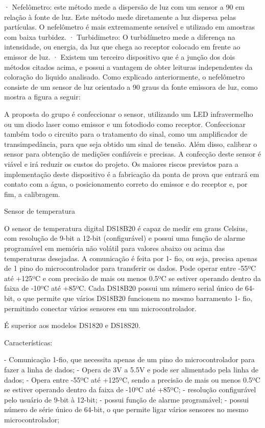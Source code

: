 ·         Nefelômetro: este método mede a dispersão de luz com um sensor a 90 em relação à fonte de luz. Este método mede diretamente a luz dispersa pelas partículas. O nefelômetro é mais extremamente sensível e utilizado em amostras com baixa turbidez.
·         Turbidimetro: O turbidímetro mede a diferença na intensidade, ou energia, da luz que chega ao receptor colocado em frente ao emissor de luz.
·         Existem um terceiro dispositivo que é a junção dos dois métodos citados acima, e possui a vantagem de obter leituras independentes da coloração do liquido analisado.
Como explicado anteriormente, o nefelômetro consiste de um sensor de luz orientado a 90 graus da fonte emissora de luz, como mostra a figura a seguir:



A proposta do grupo é confeccionar o sensor, utilizando um LED infravermelho ou um diodo laser como emissor e um fotodiodo como receptor. Confeccionar também todo o circuito para o tratamento do sinal, como um amplificador de transimpedância, para que seja obtido um sinal de tensão. Além disso, calibrar o sensor para obtenção de medições confiáveis e precisas. A confecção deste sensor é viável e irá reduzir os custos do projeto.
Os maiores riscos previstos para a implementação deste dispositivo é a fabricação da ponta de prova que entrará em contato com a água, o posicionamento correto do emissor e do receptor e, por fim, a calibragem.

Sensor de temperatura

O sensor de temperatura digital DS18B20 é capaz de medir em graus Celsius, com resolução de 9-bit a 12-bit (configurável) e possui uma função de alarme programável em memória não volátil para valores abaixo ou acima das temperaturas desejadas. A comunicação é feita por 1- fio, ou seja, precisa apenas de 1 pino do microcontrolador para transferir os dados. Pode operar entre -55ºC até +125ºC e com precisão de mais ou menos 0.5ºC se estiver operando dentro da faixa de -10ºC até +85ºC. Cada DS18B20 possui um número serial único de 64-bit, o que permite que vários DS18B20 funcionem no mesmo barramento 1- fio, permitindo conectar vários sensores em um microcontrolador.

É superior aos modelos DS1820 e DS18S20.

Características:

- Comunicação 1-fio, que necessita apenas de um pino do microcontrolador para fazer a linha de dados;
- Opera de 3V a 5.5V e pode ser alimentado pela linha de dados;
- Opera entre -55ºC até +125ºC, sendo a precisão de mais ou menos 0.5ºC se estiver operando dentro da faixa de -10ºC até +85ºC;
- resolução configurável pelo usuário de 9-bit à 12-bit;
- possui função de alarme programável;
- possui número de série único de 64-bit, o que permite ligar vários sensores no mesmo microcontrolador;

